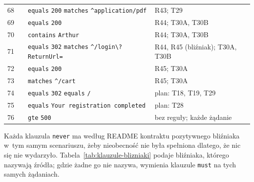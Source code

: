 {\begin{xltabular}{\linewidth}{@{}r >{\raggedright\arraybackslash}p{3.0cm} >{\raggedright\arraybackslash}X >{\raggedright\arraybackslash}p{2.4cm}@{}}
68 &  &  \texttt{equals} \texttt{200} \newline {} \texttt{matches} \texttt{\textquotedbl{}\textasciicircum{}application/pdf\textquotedbl{}} & R43; T29 \\
69 &  &  \texttt{equals} \texttt{200} & R44; T30A, T30B \\
70 &  &  \texttt{contains} \texttt{\textquotedbl{}Arthur\textquotedbl{}} & R44; T30A, T30B \\
71 &  &  \texttt{equals} \texttt{302} \newline {} \texttt{matches} \texttt{\textquotedbl{}\textasciicircum{}/login\textbackslash{}?ReturnUrl=\textquotedbl{}} & R44, R45 (bliźniak); T30A, T30B \\
72 &  &  \texttt{equals} \texttt{200} & R45; T30A \\
73 &  &  \texttt{matches} \texttt{\textquotedbl{}\textasciicircum{}/cart\textquotedbl{}} & R45; T30A \\
74 &  &  \texttt{equals} \texttt{302} \newline {} \texttt{equals} \texttt{\textquotedbl{}/\textquotedbl{}} & plan: T18, T19, T29 \\
75 &  &  \texttt{equals} \texttt{\textquotedbl{}Your registration completed\textquotedbl{}} & plan: T28 \\
76 &  &  \texttt{gte} \texttt{500} & bez reguły; każde żądanie \\
\end{xltabular}
}

Każda klauzula \texttt{never} ma według README kontraktu pozytywnego bliźniaka w~tym samym
scenariuszu, żeby nieobecność nie była spełniona dlatego, że nic się nie wydarzyło.
Tabela~\ref{tab:klauzule-blizniaki} podaje bliźniaka, którego nazywają źródła; gdzie żadne
go nie nazywa, wymienia klauzule \texttt{must} na tych samych żądaniach.

